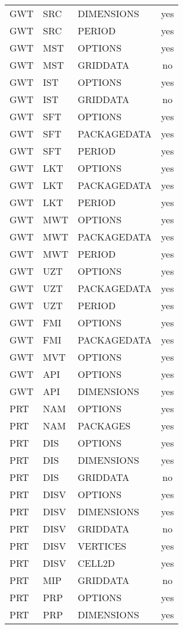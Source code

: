 \begin{longtable}{p{1.5cm} p{1.5cm} p{3cm} c}
GWT & SRC & DIMENSIONS & yes \\ 
GWT & SRC & PERIOD & yes \\ 
\hline
GWT & MST & OPTIONS & yes \\ 
GWT & MST & GRIDDATA & no \\ 
\hline
GWT & IST & OPTIONS & yes \\ 
GWT & IST & GRIDDATA & no \\ 
\hline
GWT & SFT & OPTIONS & yes \\ 
GWT & SFT & PACKAGEDATA & yes \\ 
GWT & SFT & PERIOD & yes \\ 
\hline
GWT & LKT & OPTIONS & yes \\ 
GWT & LKT & PACKAGEDATA & yes \\ 
GWT & LKT & PERIOD & yes \\ 
\hline
GWT & MWT & OPTIONS & yes \\ 
GWT & MWT & PACKAGEDATA & yes \\ 
GWT & MWT & PERIOD & yes \\ 
\hline
GWT & UZT & OPTIONS & yes \\ 
GWT & UZT & PACKAGEDATA & yes \\ 
GWT & UZT & PERIOD & yes \\ 
\hline
GWT & FMI & OPTIONS & yes \\ 
GWT & FMI & PACKAGEDATA & yes \\ 
\hline
GWT & MVT & OPTIONS & yes \\ 
\hline
GWT & API & OPTIONS & yes \\ 
GWT & API & DIMENSIONS & yes \\ 
\hline
PRT & NAM & OPTIONS & yes \\ 
PRT & NAM & PACKAGES & yes \\ 
\hline
PRT & DIS & OPTIONS & yes \\ 
PRT & DIS & DIMENSIONS & yes \\ 
PRT & DIS & GRIDDATA & no \\ 
\hline
PRT & DISV & OPTIONS & yes \\ 
PRT & DISV & DIMENSIONS & yes \\ 
PRT & DISV & GRIDDATA & no \\ 
PRT & DISV & VERTICES & yes \\ 
PRT & DISV & CELL2D & yes \\ 
\hline
PRT & MIP & GRIDDATA & no \\ 
\hline
PRT & PRP & OPTIONS & yes \\ 
PRT & PRP & DIMENSIONS & yes \\ 

\end{longtable}

